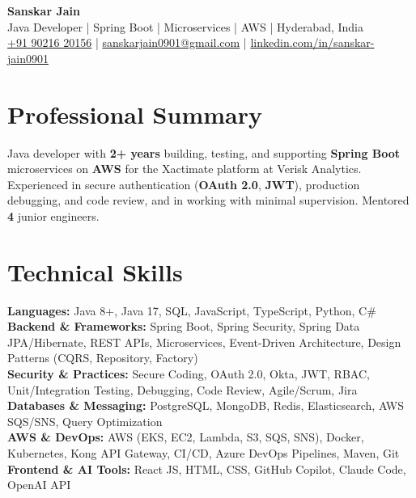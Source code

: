 \documentclass[a4paper,10pt]{article}
\begin{document}
\begin{center}
    {\LARGE \textbf{Sanskar Jain}} \\
    \vspace{2pt}
    Java Developer \;|\; Spring Boot \;|\; Microservices \;|\; AWS \;|\; Hyderabad, India \\
    \vspace{2pt}
    \href{tel:+919021620156}{+91 90216 20156} \;|\;
    \href{mailto:sanskarjain0901@gmail.com}{sanskarjain0901@gmail.com} \;|\;
    \href{https://www.linkedin.com/in/sanskar-jain0901/}{linkedin.com/in/sanskar-jain0901}
\end{center}

\section*{Professional Summary}
Java developer with \textbf{2+ years} building, testing, and supporting \textbf{Spring Boot} microservices on \textbf{AWS} for the Xactimate platform at Verisk Analytics. Experienced in secure authentication (\textbf{OAuth 2.0}, \textbf{JWT}), production debugging, and code review, and in working with minimal supervision. Mentored \textbf{4} junior engineers.

\section*{Technical Skills}
\begin{sloppypar}
\noindent
\textbf{Languages:} Java 8+, Java 17, SQL, JavaScript, TypeScript, Python, C\# \\
\textbf{Backend \& Frameworks:} Spring Boot, Spring Security, Spring Data JPA/Hibernate, REST APIs, Microservices, Event-Driven Architecture, Design Patterns (CQRS, Repository, Factory) \\
\textbf{Security \& Practices:} Secure Coding, OAuth 2.0, Okta, JWT, RBAC, Unit/Integration Testing, Debugging, Code Review, Agile/Scrum, Jira \\
\textbf{Databases \& Messaging:} PostgreSQL, MongoDB, Redis, Elasticsearch, AWS SQS/SNS, Query Optimization \\
\textbf{AWS \& DevOps:} AWS (EKS, EC2, Lambda, S3, SQS, SNS), Docker, Kubernetes, Kong API Gateway, CI/CD, Azure DevOps Pipelines, Maven, Git \\
\textbf{Frontend \& AI Tools:} React JS, HTML, CSS, GitHub Copilot, Claude Code, OpenAI API
\end{sloppypar}
\end{document}
